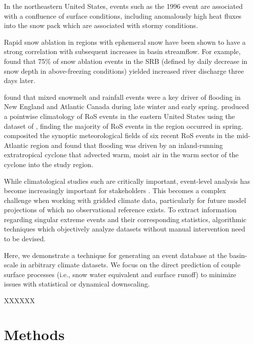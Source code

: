 \documentclass[draft]{agujournal2019}
\begin{document}
In the northeastern United States, events such as the 1996 event are associated with a confluence of surface conditions, including anomalously high heat fluxes into the snow pack which are associated with stormy conditions.

Rapid snow ablation in regions with ephemeral snow have been shown to have a strong correlation with subsequent increases in basin streamflow. For example, \citet{suriano2020discharge} found that 75\% of snow ablation events in the SRB (defined by daily decrease in snow depth in above-freezing conditions) yielded increased river discharge three days later.





\citet{collins2014annual} found that mixed snowmelt and rainfall events were a key driver of flooding in New England and Atlantic Canada during late winter and early spring. \citet{wachowicz2020rain} produced a pointwise climatology of RoS events in the eastern United States using the dataset of \citet{dyer2006spatial}, finding the majority of RoS events in the region occurred in spring. \citet{grote2021synoptic} composited the synoptic meteorological fields of six recent RoS events in the mid-Atlantic region and found that flooding was driven by an inland-running extratropical cyclone that advected warm, moist air in the warm sector of the cyclone into the study region.

While climatological studies such \citet{wachowicz2020rain} are critically important, event-level analysis has become increasingly important for stakeholders \citep{shepherd2018storylines}. This becomes a complex challenge when working with gridded climate data, particularly for future model projections of which no observational reference exists. To extract information regarding singular extreme events and their corresponding statistics, algorithmic techniques which objectively analyze datasets without manual intervention need to be devised.

Here, we demonstrate a technique for generating an event database at the basin-scale in arbitrary climate datasets. We focus on the direct prediction of couple surface processes (i.e., snow water equivalent and surface runoff) to minimize issues with statistical or dynamical downscaling. 


XXXXXX

\section{Methods}
\end{document}
